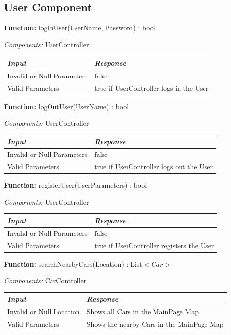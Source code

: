 \documentclass[a4paper]{article}
\begin{document}
\subsection{User Component}
\textbf{Function:} logInUser(UserName, Password) : bool \par
\textit{Components:} UserController
\begin{center}
\begin{tabular}{ | L{6cm} | L{6cm} | }
\hline
	\textit{Input}& \textit{Response}\\ \hline
	Invalid or Null Parameters & false\\ \hline
	Valid Parameters & true if UserController logs in the User\\ \hline
\end{tabular}
\end{center}
\textbf{Function:} logOutUser(UserName) : bool \par
\textit{Components:} UserController
\begin{center}
\begin{tabular}{ | L{6cm} | L{6cm} | }
\hline
	\textit{Input}& \textit{Response}\\ \hline
	Invalid or Null Parameters & false\\ \hline
	Valid Parameters & true if UserController logs out the User\\ \hline
\end{tabular}
\end{center}
\textbf{Function:} registerUser(UserParameters) : bool \par
\textit{Components:} UserController
\begin{center}
\begin{tabular}{ | L{6cm} | L{6cm} | }
\hline
	\textit{Input}& \textit{Response}\\ \hline
	Invalid or Null Parameters & false\\ \hline
	Valid Parameters & true if UserController registers the User\\ \hline
\end{tabular}
\end{center}

\textbf{Function:} searchNearbyCars(Location) : List\(<Car>\) \par
\textit{Components:} CarController
\begin{center}
\begin{tabular}{ | L{6cm} | L{6cm} | }
\hline
	\textit{Input}& \textit{Response}\\ \hline
	Invalid or Null Location & Shows all Cars in the MainPage Map\\ \hline
	Valid Parameters & Shows the nearby Cars in the MainPage Map\\ \hline
\end{tabular}
\end{center}
\newpage
\end{document}
